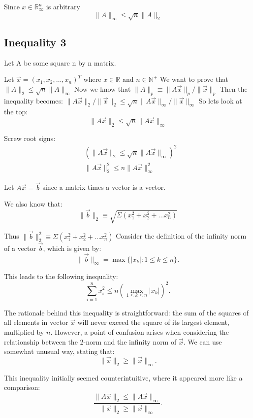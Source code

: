 \documentclass{article}
\begin{document}
Since $x \in \mathbb{R}_{\infty}^n$ is arbitrary
$$
\|A\|_{\infty} \leq \sqrt{n}\|A\|_2
$$
\subsection{Inequality 3}
Let $\mathrm{A}$ be some square $\mathrm{n}$ by $\mathrm{n}$ matrix.

Let $\vec{x}=\left(x_1, x_2, \ldots, x_n\right)^T$ where $x \in \mathbb{R}$ and $n \in \mathbb{N}^{+}$
We want to prove that $\|A\|_2 \leq \sqrt{n}\|A\|_{\infty}$
Now we know that $\|A\|_p \equiv\|A \vec{x}\|_p /\|\vec{x}\|_p$
Then the inequality becomes: $\|A \vec{x}\|_2 /\|\vec{x}\|_2 \leq \sqrt{n}\|A \vec{x}\|_{\infty} /\|\vec{x}\|_{\infty}$
So lets look at the top:
$$
\|A \vec{x}\|_2 \leq \sqrt{n}\|A \vec{x}\|_{\infty}
$$

Screw root signs:
$$
\begin{aligned}
& \left(\|A \vec{x}\|_2 \leq \sqrt{n}\|A \vec{x}\|_{\infty}\right)^2 \\
& \|A \vec{x}\|_2^2 \leq n\|A \vec{x}\|_{\infty}^2
\end{aligned}
$$

Let $A \vec{x}=\vec{b}$ since a matrix times a vector is a vector.

We also know that:
$$
\|\vec{b}\|_2 \equiv \sqrt{\Sigma\left(x_1^2+x_2^2+\ldots x_n^2\right)}
$$

Thus $\|\vec{b}\|_2^2 \equiv \Sigma\left(x_1^2+x_2^2+\ldots x_n^2\right)$
Consider the definition of the infinity norm of a vector \(\vec{b}\), which is given by:
$$
\|\vec{b}\|_{\infty} = \max \{|x_k| : 1 \leq k \leq n\}.
$$

This leads to the following inequality:
$$
\sum_{i=1}^{n} x_i^2 \leq n \left(\max_{1 \leq k \leq n} |x_k|\right)^2.
$$

The rationale behind this inequality is straightforward: the sum of the squares of all elements in vector \(\vec{x}\) will never exceed the square of its largest element, multiplied by \(n\). However, a point of confusion arises when considering the relationship between the 2-norm and the infinity norm of \(\vec{x}\). We 
can use somewhat unusual way, stating that:
$$
\|\vec{x}\|_2 \geq \|\vec{x}\|_{\infty}.
$$

This inequality initially seemed counterintuitive, where it appeared more like a comparison:
$$
\frac{\|A \vec{x}\|_2 \leq \|A \vec{x}\|_{\infty}}{\|\vec{x}\|_2 \geq \|\vec{x}\|_{\infty}}.
$$
\end{document}
